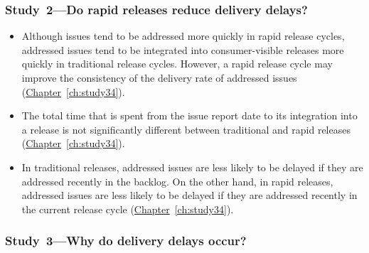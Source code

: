 \subsubsection*{Study~2---Do rapid releases reduce delivery delays?}

\begin{itemize}

	\item Although issues tend to be addressed more quickly in rapid
		release cycles, addressed issues tend to be integrated into
		consumer-visible releases more quickly in traditional
		release cycles. However, a rapid release cycle may improve the
		consistency of the delivery rate of addressed issues
		(\hyperref[ch:study34]{Chapter}~\ref{ch:study34}).

	\item The total time that is spent from the issue report date to its
		integration into a release is not significantly different
		between traditional and rapid releases
		(\hyperref[ch:study34]{Chapter}~\ref{ch:study34}).

	\item In traditional releases, addressed issues are less likely to be
		delayed if they are addressed recently in the backlog. On the
		other hand, in rapid releases, addressed issues are less likely
		to be delayed if they are addressed recently in the current
		release cycle (\hyperref[ch:study34]{Chapter}~\ref{ch:study34}). 
\end{itemize}

\subsubsection*{Study~3---Why do delivery delays occur?}

